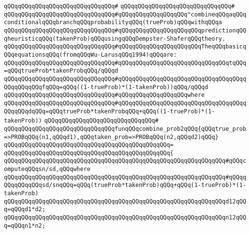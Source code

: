 \verb|qQQqqQQqqQQqqQQqqQQqqQQqqQQqqQQq#|\newline
\verb|qQQqqQQqqQQqqQQqqQQqqQQqqQQqqQQq#|\newline
\verb|qQQqqQQqqQQqqQQqqQQqqQQqqQQqqQQq#qQQqqQQqqQQqqQQqqQQq"combineqQQqaqQQqconditionalqQQqbranchqQQqprobabilityqQQq(trueProb)qQQqwithqQQqa|\newline
\verb|qQQqqQQqqQQqqQQqqQQqqQQqqQQqqQQq#qQQqqQQqqQQqqQQqqQQqqQQqpredictionqQQqheuristicqQQq(takenProb)qQQqusingqQQqDempster-ShaferqQQqtheory.|\newline
\verb|qQQqqQQqqQQqqQQqqQQqqQQqqQQqqQQq#qQQqqQQqqQQqqQQqqQQqqQQqTheqQQqbasicqQQqequationsqQQq(fromqQQqWu-LarusqQQq1994)qQQqare:|\newline
\verb|qQQqqQQqqQQqqQQqqQQqqQQqqQQqqQQq#qQQqqQQqqQQqqQQqqQQqqQQqqQQqqQQqtqQQq=qQQqtrueProb*takenProbqQQq/qQQqd|\newline
\verb|qQQqqQQqqQQqqQQqqQQqqQQqqQQqqQQq#qQQqqQQqqQQqqQQqqQQqqQQqqQQqqQQqqQQqqQQqqQQqqQQqfqQQq=qQQq((1-trueProb)*(1-takenProb))qQQq/qQQqd|\newline
\verb|qQQqqQQqqQQqqQQqqQQqqQQqqQQqqQQq#qQQqqQQqqQQqqQQqqQQqwhere|\newline
\verb|qQQqqQQqqQQqqQQqqQQqqQQqqQQqqQQq#qQQqqQQqqQQqqQQqqQQqqQQqqQQqqQQqqQQqqQQqqQQqdqQQq=qQQqtrueProb*takenProbqQQq+qQQq((1-trueProb)*(1-takenProb))|\newline
\verb|qQQqqQQqqQQqqQQqqQQqqQQqqQQqqQQq#|\newline
\newline
\verb|qQQqqQQqqQQqqQQqqQQqqQQqqQQqqQQqfunqQQqcombine_prob2qQQq{qQQqtrue_prob=>PROBqQQq(n1,qQQqd1),qQQqtaken_prob=>PROBqQQq(n2,qQQqd2)qQQq}|\newline
\verb|qQQqqQQqqQQqqQQqqQQqqQQqqQQqqQQqqQQqqQQqqQQqqQQq=|\newline
\verb|qQQqqQQqqQQqqQQqqQQqqQQqqQQqqQQqqQQqqQQqqQQqqQQq{|\newline
\verb|qQQqqQQqqQQqqQQqqQQqqQQqqQQqqQQqqQQqqQQqqQQqqQQqqQQqqQQqqQQqqQQq#qQQqcomputeqQQqsn/sd,qQQqwhere|\newline
\verb|qQQqqQQqqQQqqQQqqQQqqQQqqQQqqQQqqQQqqQQqqQQqqQQqqQQqqQQqqQQqqQQq#qQQqqQQqqQQqqQQqsd/snqQQq=qQQq(trueProb*takenProb)qQQq+qQQq(1-trueProb)*(1-takenProb)|\newline
\newline
\verb|qQQqqQQqqQQqqQQqqQQqqQQqqQQqqQQqqQQqqQQqqQQqqQQqqQQqqQQqqQQqqQQqd12qQQq=qQQqd1*d2;|\newline
\verb|qQQqqQQqqQQqqQQqqQQqqQQqqQQqqQQqqQQqqQQqqQQqqQQqqQQqqQQqqQQqqQQqn12qQQq=qQQqn1*n2;|\newline

